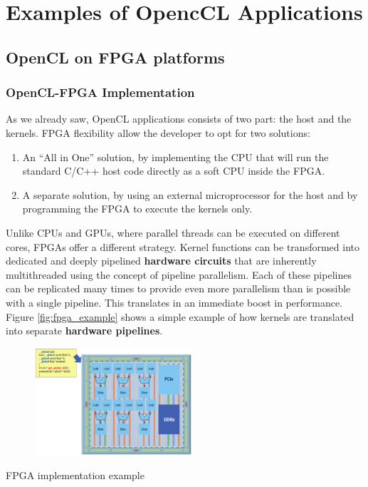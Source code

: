\section{Examples of OpencCL Applications}


\subsection{OpenCL on FPGA platforms}

\subsubsection{OpenCL-FPGA Implementation}
As we already saw, OpenCL applications consists of two part: the host and the kernels.
FPGA flexibility allow the developer to opt for two solutions:

\begin{enumerate}
	\item An "`All in One"' solution, by implementing the CPU that will run the standard C/C++ host code directly as a soft CPU inside the FPGA.
	\item A separate solution, by using an external microprocessor for the host and by programming the FPGA to execute the kernels only.
	\end{enumerate}
	
Unlike CPUs and GPUs, where parallel threads can be executed on different cores, FPGAs offer a different strategy. Kernel functions can be transformed into dedicated and deeply pipelined \textbf{hardware circuits} that are inherently multithreaded using the concept of pipeline parallelism. Each of these pipelines can be replicated many times to provide even more parallelism than is possible with a single pipeline. This translates in an immediate boost in performance.\\
Figure \ref {fig:fpga_example} shows a simple example of how kernels are translated into separate \textbf{hardware pipelines}.
	
\begin{figurehere}
 \centering
 \includegraphics[width=8cm, height=4cm]{./eps/FPGA1.eps}
 \caption{FPGA implementation example}
 \label{fig:fpga_example}
\end{figurehere}

